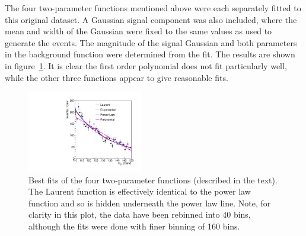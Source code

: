 The four two-parameter functions mentioned above were each
separately fitted to this
original dataset. A Gaussian signal component was also included, where the
mean and width of the Gaussian were fixed to the same values as used to
generate the events.
The magnitude of the signal Gaussian and both parameters in the
background function were determined from the fit.
The results are shown in figure~\ref{fig:functions:bestfits}.
It is clear the first order polynomial does not fit particularly well,
while the other three functions appear to give reasonable fits.
%
\begin{figure}[tbp]
\centering
\includegraphics[width=0.45\textwidth]{functions/BestFits.pdf}
\caption{Best fits of the four two-parameter functions (described in the
text).
The Laurent function is effectively identical to the power law function
and so is hidden underneath the power law line.
Note, for clarity in this plot, the
data have been rebinned into 40 bins, although the fits were done with
finer binning of 160 bins.}
\label{fig:functions:bestfits}
\end{figure}


